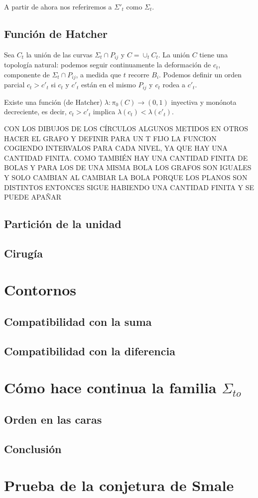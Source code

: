 \documentclass[twoside, 11pt]{article}
\begin{document}
A partir de ahora nos referiremos a $\Sigma'_t$ como $\Sigma_t$. 

\subsection{Función de Hatcher}
Sea $C_t$ la unión de las curvas $\Sigma_t\cap P_{ij}$ y $C=\cup_t C_t$. La unión $C$ tiene una topología natural: podemos seguir continuamente la deformación de $c_t$, componente de $\Sigma_t\cap P_{ij}$, a medida que $t$ recorre $B_i$. Podemos definir un orden parcial $c_t>c'_t$ si $c_t$ y $c'_t$ están en el mismo $P_{ij}$ y $c_t$ rodea a $c'_t$. 

\begin{prop}
Existe una función (de Hatcher) $\lambda:\pi_0(C)\to (0,1)$ inyectiva y monónota decreciente, es decir, $c_t>c'_t$ implica $\lambda(c_t)<\lambda(c'_t)$.
\end{prop}
\begin{dem}
CON LOS DIBUJOS DE LOS CÍRCULOS ALGUNOS METIDOS EN OTROS HACER EL GRAFO Y DEFINIR PARA UN T FIJO LA FUNCION COGIENDO INTERVALOS PARA CADA NIVEL, YA QUE HAY UNA CANTIDAD FINITA. COMO TAMBIÉN HAY UNA CANTIDAD FINITA DE BOLAS Y PARA LOS DE UNA MISMA BOLA LOS GRAFOS SON IGUALES Y SOLO CAMBIAN AL CAMBIAR LA BOLA PORQUE LOS PLANOS SON DISTINTOS ENTONCES SIGUE HABIENDO UNA CANTIDAD FINITA Y SE PUEDE APAÑAR
\QED
\end{dem}
\subsection{Partición de la unidad}
\subsection{Cirugía}

\section{Contornos}
\subsection{Compatibilidad con la suma}
\subsection{Compatibilidad con la diferencia}

\section{Cómo hace continua la familia $\Sigma_{to}$}
\subsection{Orden en las caras}
\subsection{Conclusión}


\section{Prueba de la conjetura de Smale}
\end{document}
